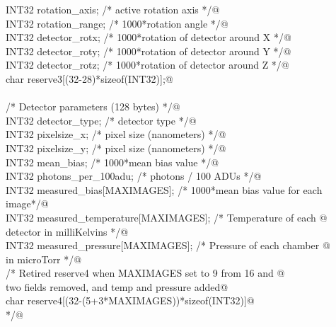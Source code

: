 \documentclass[10pt,a4paper,twoside,notitlepage]{article}
\begin{document}
\begin{flushleft}
\begin{list}{}{}
\mbox{}\verb@         INT32 rotation_axis;          /* active rotation axis */@\\
\mbox{}\verb@         INT32 rotation_range;         /* 1000*rotation angle */@\\
\mbox{}\verb@         INT32 detector_rotx;          /* 1000*rotation of detector  around X */@\\
\mbox{}\verb@         INT32 detector_roty;          /* 1000*rotation of detector  around Y */@\\
\mbox{}\verb@         INT32 detector_rotz;          /* 1000*rotation of detector  around Z */@\\
\mbox{}\verb@         char reserve3[(32-28)*sizeof(INT32)];@\\
\mbox{}\verb@@\\
\mbox{}\verb@         /* Detector parameters (128 bytes) */@\\
\mbox{}\verb@         INT32 detector_type;            /* detector type */@\\
\mbox{}\verb@         INT32 pixelsize_x;              /* pixel size (nanometers) */@\\
\mbox{}\verb@         INT32 pixelsize_y;              /* pixel size (nanometers) */@\\
\mbox{}\verb@         INT32 mean_bias;                        /* 1000*mean bias value */@\\
\mbox{}\verb@         INT32 photons_per_100adu;       /* photons / 100 ADUs */@\\
\mbox{}\verb@         INT32 measured_bias[MAXIMAGES]; /* 1000*mean bias value for each image*/@\\
\mbox{}\verb@         INT32 measured_temperature[MAXIMAGES];  /* Temperature of each  @\\
\mbox{}\verb@                                                    detector in milliKelvins */@\\
\mbox{}\verb@         INT32 measured_pressure[MAXIMAGES]; /* Pressure of each  chamber @\\
\mbox{}\verb@                                               in microTorr */@\\
\mbox{}\verb@         /* Retired reserve4 when MAXIMAGES set to 9 from 16 and @\\
\mbox{}\verb@            two fields removed, and temp and pressure added@\\
\mbox{}\verb@          char reserve4[(32-(5+3*MAXIMAGES))*sizeof(INT32)]@\\
\mbox{}\verb@         */@\\

\end{list}
\end{flushleft}
\end{document}
